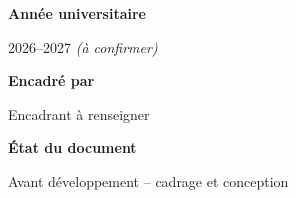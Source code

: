 \begin{titlepage}
\begin{minipage}[t]{.47\textwidth}
\vspace{8mm}\textbf{Année universitaire}\par 2026--2027 \textit{(à confirmer)}
\end{minipage}\hfill
\begin{minipage}[t]{.47\textwidth}
\sffamily\textbf{Encadré par}\par
\textcolor{Muted}{Encadrant à renseigner}\par
\vspace{8mm}\textbf{État du document}\par
\textcolor{Forest}{Avant développement -- cadrage et conception}
\end{minipage}
\vspace{15mm}
\end{titlepage}
